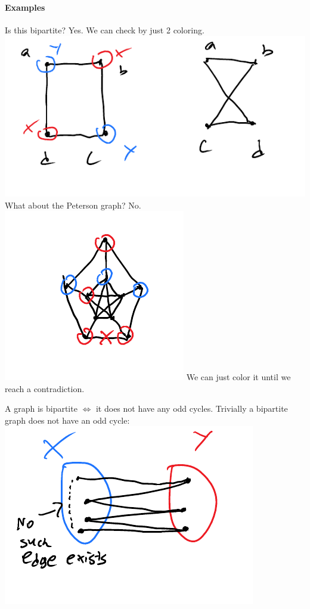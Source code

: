 \documentclass[12 pt]{article}
\begin{document}
        \paragraph{Examples}Is this bipartite? Yes. We can check by
        just 2 coloring.
        \\\includegraphics[width=.7\textwidth]{i44.pdf}
        \\ What about the Peterson graph? No.
        \\\includegraphics[width=.7\textwidth]{i45.pdf}
        We can just color it until we reach a contradiction.

        A graph is bipartite $\iff$ it does not have any odd
        cycles. Trivially a bipartite graph does not have an odd
        cycle: \\\includegraphics[width=.9\textwidth]{i46.pdf}
\end{document}
